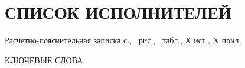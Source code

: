 \section*{СПИСОК ИСПОЛНИТЕЛЕЙ}

Расчетно-пояснительная записка \pageref{LastPage} с., \totalfigures\ рис., \totaltables\ табл., Х ист., Х прил.

КЛЮЧЕВЫЕ СЛОВА

\pagebreak